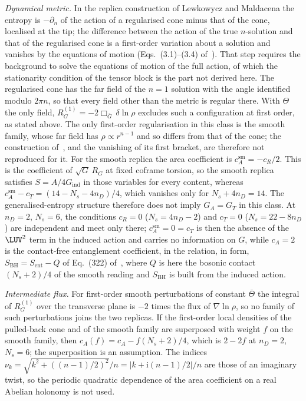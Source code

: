 \emph{Dynamical metric.} In the replica construction of Lewkowycz and Maldacena the entropy is \(-\partial_n\) of the action of a regularised cone minus that of the cone, localised at the tip; the difference between the action of the true \(n\)-solution and that of the regularised cone is a first-order variation about a solution and vanishes by the equations of motion (Eqs.~(3.1)--(3.4) of~\cite{LewkowyczMaldacena2013}). That step requires the background to solve the equations of motion of the full action, of which the stationarity condition of the tensor block is the part not derived here. The regularised cone has the far field of the \(n=1\) solution with the angle identified modulo \(2\pi n\), so that every field other than the metric is regular there. With \(\Theta\) the only field, \(R_G^{(1)}=-2\Box_{\bar G}\,\delta\ln\rho\) excludes such a configuration at first order, as stated above. The only first-order regularisation in this class is the smooth family, whose far field has \(\rho\propto r^{n-1}\) and so differs from that of the cone; the construction of~\cite{LewkowyczMaldacena2013}, and the vanishing of its first bracket, are therefore not reproduced for it. For the smooth replica the area coefficient is \(c_A^{\mathrm{sm}}=-c_R/2\). This is the coefficient of \(\sqrt G\,R_G\) at fixed coframe torsion, so the smooth replica satisfies \(S=A/4G_{\mathrm{ind}}\) in those variables for every content, whereas \(c_A^{\mathrm{sm}}-c_T=(14-N_s-4n_D)/4\), which vanishes only for \(N_s+4n_D=14\). The generalised-entropy structure therefore does not imply \(G_A=G_T\) in this class. At \(n_D=2\), \(N_s=6\), the conditions \(c_R=0\) (\(N_s=4n_D-2\)) and \(c_T=0\) (\(N_s=22-8n_D\)) are independent and meet only there; \(c_A^{\mathrm{sm}}=0=c_T\) is then the absence of the \(\LUV^2\) term in the induced action and carries no information on \(G\), while \(c_A=2\) is the contact-free entanglement coefficient, in the relation, in form, \(S_{\mathrm{BH}}=S_{\mathrm{ent}}-Q\) of Eq.~(322) of~\cite{Solodukhin2011}, where \(Q\) is here the bosonic contact \((N_s+2)/4\) of the smooth reading and \(S_{\mathrm{BH}}\) is built from the induced action.

\emph{Intermediate flux.} For first-order smooth perturbations of constant \(\bar\Theta\) the integral of \(R_G^{(1)}\) over the transverse plane is \(-2\) times the flux of \(\nabla\ln\rho\), so no family of such perturbations joins the two replicas. If the first-order local densities of the pulled-back cone and of the smooth family are superposed with weight \(f\) on the smooth family, then \(c_A(f)=c_A-f(N_s+2)/4\), which is \(2-2f\) at \(n_D=2\), \(N_s=6\); the superposition is an assumption. The indices \(\nu_k=\sqrt{k^2+((n-1)/2)^2}/n=|k+\mathrm i(n-1)/2|/n\) are those of an imaginary twist, so the periodic quadratic dependence of the area coefficient on a real Abelian holonomy is not used.


